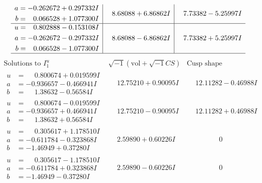\documentclass[1p]{elsarticle_modified}
\theoremstyle{definition}
\newcommand{\I}{\sqrt{-1}}
\begin{document}
$$\begin{array}{c|c|c}
\begin{aligned}
a &= -0.262672 + 0.297332 I \\
b &= \phantom{-}0.066528 + 1.077300 I\end{aligned}
 & \phantom{-}8.68088 + 6.86862 I & \phantom{-}7.73382 - 5.25997 I \\ \hline\begin{aligned}
u &= \phantom{-}0.802888 - 0.153108 I \\
a &= -0.262672 - 0.297332 I \\
b &= \phantom{-}0.066528 - 1.077300 I\end{aligned}
 & \phantom{-}8.68088 - 6.86862 I & \phantom{-}7.73382 + 5.25997 I\\
 \hline 
 \end{array}$$\newpage$$\begin{array}{c|c|c}  
\text{Solutions to }I^u_{1}& \I (\text{vol} + \sqrt{-1}CS) & \text{Cusp shape}\\
 \hline 
\begin{aligned}
u &= \phantom{-}0.800674 + 0.019599 I \\
a &= -0.936657 - 0.466941 I \\
b &= \phantom{-}1.38632 - 0.56584 I\end{aligned}
 & \phantom{-}12.75210 + 0.90095 I & \phantom{-}12.11282 - 0.46988 I \\ \hline\begin{aligned}
u &= \phantom{-}0.800674 - 0.019599 I \\
a &= -0.936657 + 0.466941 I \\
b &= \phantom{-}1.38632 + 0.56584 I\end{aligned}
 & \phantom{-}12.75210 - 0.90095 I & \phantom{-}12.11282 + 0.46988 I \\ \hline\begin{aligned}
u &= \phantom{-}0.305617 + 1.178510 I \\
a &= -0.611784 - 0.323868 I \\
b &= -1.46949 + 0.37280 I\end{aligned}
 & \phantom{-}2.59890 + 0.60226 I & \phantom{-0.000000 } 0 \\ \hline\begin{aligned}
u &= \phantom{-}0.305617 - 1.178510 I \\
a &= -0.611784 + 0.323868 I \\
b &= -1.46949 - 0.37280 I\end{aligned}
 & \phantom{-}2.59890 - 0.60226 I & \phantom{-0.000000 } 0 \\ \hline\begin{aligned}

\end{aligned}
\end{array}$$
\end{document}
